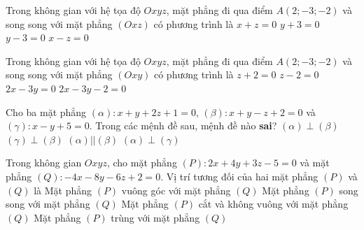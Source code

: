 \begin{ex}%
	Trong không gian với hệ tọa độ  $Oxyz$, mặt phẳng đi qua điểm $A(2;-3;-2)$ và song song với mặt phẳng $(Oxz)$ có phương trình là
	 \choice
		{$x  + z = 0$}
		{\True $y + 3  = 0$}
		{$y - 3 = 0$} 
		 {$x - z = 0$}
\end{ex}

\begin{ex}%
	Trong không  gian với hệ tọa độ $Oxyz$, mặt phẳng đi qua điểm $A(2;-3;-2)$ và song song với mặt phẳng $(Oxy)$ có phương trình là
	 \choice
		{\True $z +2=0$} 
		 {$z-2=0$}
		{$2x-3y=0$} 
		 {$2x-3y-2=0$}
\end{ex}

\begin{ex}%
	Cho ba mặt phẳng $(\alpha)\colon x+y+2 z+1=0$, $(\beta)\colon x+y-z+2=0$ và $(\gamma)\colon x-y+5=0$. Trong các  mệnh đề sau, mệnh đề nào \textbf{sai}?
	 \choice
		{$(\alpha) \perp(\beta)$} 
		{$(\gamma)  \perp(\beta)$}
		 {\True $(\alpha) || (\beta)$}
		{$(\alpha) \perp(\gamma)$} 
\end{ex}

\begin{ex}%
	Trong không gian $Oxyz$, cho mặt phẳng $(P)\colon 2x+4y+3z-5=0$ và mặt phẳng \break$(Q)\colon -4x-8y-6z+2=0$. Vị trí tương đối  của hai mặt phẳng $(P)$ và $(Q)$ là
	 \choice
		{Mặt phẳng  $(P)$ vuông góc với mặt phẳng $(Q)$}
		{\True Mặt phẳng $(P)$ song song với mặt phẳng $(Q)$} 
		{Mặt phẳng  $(P)$ cắt và không vuông với mặt phẳng $(Q)$}
		{Mặt phẳng $(P)$ trùng với mặt  phẳng $(Q)$}
\end{ex}

